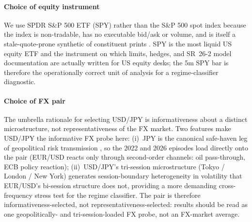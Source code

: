 \documentclass[preprint,12pt,authoryear]{elsarticle}
\begin{document}
\paragraph{Choice of equity instrument}
We use SPDR S\&P 500 ETF (SPY) rather than the S\&P 500 spot index because the index is non-tradable, has no executable bid/ask or volume, and is itself a stale-quote-prone synthetic of constituent prints \citep{HasbrouckOneSecurity1995}. SPY is the most liquid US equity ETF and the instrument on which limits, hedges, and SR~26-2 model documentation are actually written for US equity desks; the 5m SPY bar is therefore the operationally correct unit of analysis for a regime-classifier diagnostic.

\paragraph{Choice of FX pair}
The umbrella rationale for selecting USD/JPY is informativeness about a distinct microstructure, not representativeness of the FX market. Two features make USD/JPY the informative FX probe here: (i)~JPY is the canonical safe-haven leg of geopolitical risk transmission \citep{CaldaraIacoviello2022}, so the 2022 and 2026 episodes load directly onto the pair (EUR/USD reacts only through second-order channels: oil pass-through, ECB policy reaction); (ii)~USD/JPY's tri-session microstructure (Tokyo / London / New York) generates session-boundary heterogeneity in volatility that EUR/USD's bi-session structure does not, providing a more demanding cross-frequency stress test for the regime classifier. The pair is therefore informativeness-selected, not representativeness-selected: results should be read as one geopolitically- and tri-session-loaded FX probe, not an FX-market average. 
\end{document}
